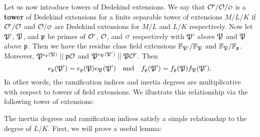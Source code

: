     Let us now introduce towers of Dedekind extensions. We say that $\mc{O}'/\mc{O}/\smc{O}$ is a \textbf{tower} of Dedekind extensions for a finite separable tower of extensions $M/L/K$ if $\mathcal{O}'/\mathcal{O}$ and $\mc{O}/\smc{O}$ are Dedekind extensions for $M/L$ and $L/K$ respectively. Now let $\mathfrak{P}'$, $\mathfrak{P}$, and $\mathfrak{p}$ be primes of $\mathcal{O}'$, $\mathcal{O}$, and $\smc{O}$ respectively with $\mathfrak{P}'$ above $\mathfrak{P}$ and $\mathfrak{P}$ above $\mathfrak{p}$. Then we have the residue class field extensions $\mathbb{F}_{\mathfrak{P}'}/\mathbb{F}_{\mathfrak{P}}$ and $\mathbb{F}_{\mathfrak{P}}/\mathbb{F}_{\mathfrak{p}}$. Moreover, $\mathfrak{P}^{e_{\mathfrak{p}}(\mathfrak{P})} \mid\mid \mathfrak{p}\mathcal{O}$ and $\mathfrak{P}^{e_{\mathfrak{P}}(\mathfrak{P}')} \mid\mid \mathfrak{P}\mathcal{O}'$. Then
    \begin{equation}\label{equ:ramification_and_interia_towers}
      e_{\mathfrak{p}}(\mathfrak{P}') = e_{\mathfrak{p}}(\mathfrak{P})e_{\mathfrak{P}}(\mathfrak{P}') \quad \text{and} \quad f_{\mathfrak{p}}(\mathfrak{P}') = f_{\mathfrak{p}}(\mathfrak{P})f_{\mathfrak{P}}(\mathfrak{P}').
    \end{equation}
    In other words, the ramification indices and inertia degrees are multiplicative with respect to towers of field extensions. We illustrate this relationship via the following tower of extensions:

    \begin{center}
    \end{center}
    
    The inertia degrees and ramification indices satisfy a simple relationship to the degree of $L/K$. First, we will prove a useful lemma:

